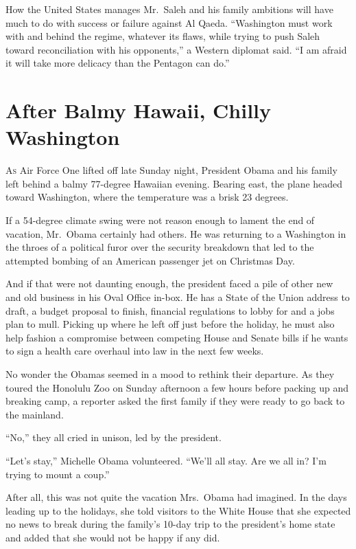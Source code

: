 ﻿\documentclass[12pt]{article}
\begin{document}
How the United States manages Mr.~Saleh and his family ambitions will have much to do with success
or failure against Al Qaeda. ``Washington must work with and behind the regime, whatever its flaws,
while trying to push Saleh toward reconciliation with his opponents,'' a Western diplomat said. ``I
am afraid it will take more delicacy than the Pentagon can do.''

\section{After Balmy Hawaii, Chilly Washington}

\lettrine{A}{s} Air Force One lifted off late Sunday night, President Obama
and his family left behind a balmy 77-degree Hawaiian evening. Bearing east, the plane headed toward
Washington, where the temperature was a brisk 23 degrees.

If a 54-degree climate swing were not reason enough to lament the end of vacation, Mr.~Obama
certainly had others. He was returning to a Washington in the throes of a political furor over the
security breakdown that led to the attempted bombing of an American passenger jet on Christmas Day.

And if that were not daunting enough, the president faced a pile of other new and old business in
his Oval Office in-box. He has a State of the Union address to draft, a budget proposal to finish,
financial regulations to lobby for and a jobs plan to mull. Picking up where he left off just before
the holiday, he must also help fashion a compromise between competing House and Senate bills if he
wants to sign a health care overhaul into law in the next few weeks.

No wonder the Obamas seemed in a mood to rethink their departure. As they toured the Honolulu Zoo on
Sunday afternoon a few hours before packing up and breaking camp, a reporter asked the first family
if they were ready to go back to the mainland.

``No,'' they all cried in unison, led by the president.

``Let's stay,'' Michelle Obama volunteered. ``We'll all stay. Are we all in? I'm trying to mount a
coup.''

After all, this was not quite the vacation Mrs.~Obama had imagined. In the days leading up to the
holidays, she told visitors to the White House that she expected no news to break during the
family's 10-day trip to the president's home state and added that she would not be happy if any did.
\end{document}

